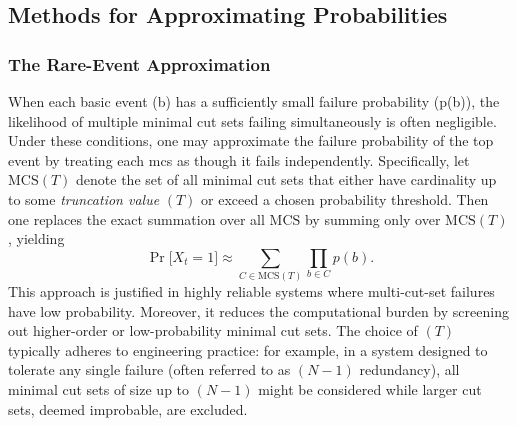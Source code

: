 \subsection{Methods for Approximating Probabilities}
\subsubsection{The Rare-Event Approximation}
When each basic event (b) has a sufficiently small failure probability (p(b)), the likelihood of multiple minimal cut sets failing simultaneously is often negligible. Under these conditions, one may approximate the failure probability of the top event by treating each \acrlong{mcs} as though it fails independently. Specifically, let $\mathrm{MCS}(T)$ denote the set of all minimal cut sets that either have cardinality up to some \emph{truncation value} $(T)$ or exceed a chosen probability threshold. Then one replaces the exact summation over all $\mathrm{MCS}$ by summing only over $\mathrm{MCS}(T)$, yielding
\begin{equation}\label{eq:rare_event_approx}
\Pr\bigl[X_t=1\bigr]
\approx
\sum_{C \in \mathrm{MCS}(T)}
\prod_{b \in C} p(b).
\end{equation}
This approach is justified in highly reliable systems where multi-cut-set failures have low probability. Moreover, it reduces the computational burden by screening out higher-order or low-probability minimal cut sets. The choice of $(T)$ typically adheres to engineering practice: for example, in a system designed to tolerate any single failure (often referred to as $(N-1)$ redundancy), all minimal cut sets of size up to $(N-1)$ might be considered while larger cut sets, deemed improbable, are excluded.

